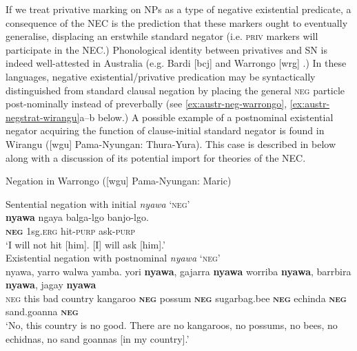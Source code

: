 \documentclass[output=paper,draft,draftmode,colorlinks,citecolor=brown]{langscibook}
\begin{document}
If we treat privative marking on NPs as a type of negative existential
    predicate, a consequence of the NEC is the prediction that these
    markers ought to eventually generalise, displacing an erstwhile
    standard negator (i.e. \textsc{priv}  markers will participate in the
    NEC.) Phonological identity between privatives and SN is indeed
    well-attested in Australia (e.g. Bardi [bcj] \citep{Bowern2012} and
    Warrongo [wrg] \citep{Tsunoda2011}.) In these languages, negative
    existential\slash privative predication may be syntactically distinguished
    from standard clausal negation by placing the general \textsc{neg}
    particle post-nominally instead of preverbally (see
    \ref{ex:austr-neg-warrongo},
    \ref{ex:austr-negstrat-wirangu}a--b below.) A possible example of a postnominal
    existential negator acquiring the function of clause-initial standard
    negator is found in Wirangu ([wgu] Pama-Nyungan: Thura-Yura).
    This case is described in  below along with a
    discussion of its potential import for theories of the NEC.

    \begin{exe}\ex\label{ex:austr-neg-warrongo} Negation in Warrongo ([wgu] Pama-Nyungan: Maric)
        \begin{xlist}
\ex Sentential negation with initial \textit{nyawa} `\textsc{neg}'\\
\gll \textbf{nyawa} ngaya balga-lgo banjo-lgo.\\
\textsc{\textbf{neg}} 1sg\textsc{.erg} hit\textsc{-purp} ask\textsc{-purp}\\
\glt `I will not hit [him]. [I] will ask [him].'\citep[363]{Tsunoda2011}\\
%
\ex Existential negation with postnominal \textit{nyawa} `\textsc{neg}'\\
\gll nyawa, yarro walwa yamba. yori \textbf{nyawa}, gajarra \textbf{nyawa} worriba \textbf{nyawa}, barrbira \textbf{nyawa}, jagay \textbf{nyawa}\\
\textsc{neg} this bad country kangaroo \textsc{\textbf{neg}} possum \textbf{\textsc{neg}} sugarbag.bee \textbf{\textsc{neg}} echinda \textbf{\textsc{neg}} sand.goanna \textbf{\textsc{neg}}\\
\glt `No, this country is no good. There are no kangaroos, no possums, no bees, no echidnas, no sand goannas [in my country].'\\
            \citep[661]{Tsunoda2011}\\
        \end{xlist}\end{exe}
\end{document}
